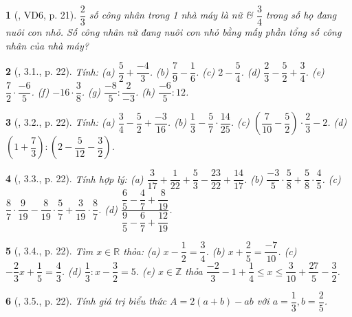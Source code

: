 \documentclass{article}
\newtheorem{baitoan}{}
\begin{document}
\begin{baitoan}[\cite{Binh_boi_duong_Toan_6_tap_2}, VD6, p. 21]
	$\dfrac{2}{3}$ số công nhân trong 1 nhà máy là nữ \& $\dfrac{3}{4}$ trong số họ đang nuôi con nhỏ. Số công nhân nữ đang nuôi con nhỏ bằng mấy phần tổng số công nhân của nhà máy?
\end{baitoan}

\begin{baitoan}[\cite{Binh_boi_duong_Toan_6_tap_2}, 3.1., p. 22]
	Tính: (a) $\dfrac{5}{2} + \dfrac{-4}{3}$. (b) $\dfrac{7}{9} - \dfrac{1}{6}$. (c) $2 - \dfrac{5}{4}$. (d) $\dfrac{2}{3} - \dfrac{5}{2} + \dfrac{3}{4}$. (e) $\dfrac{7}{2}\cdot\dfrac{-6}{5}$. (f) $-16\cdot\dfrac{3}{8}$. (g) $\dfrac{-8}{5}:\dfrac{2}{-3}$. (h) $\dfrac{-6}{5}:12$.
\end{baitoan}

\begin{baitoan}[\cite{Binh_boi_duong_Toan_6_tap_2}, 3.2., p. 22]
	Tính: (a) $\dfrac{3}{4} - \dfrac{5}{2} + \dfrac{-3}{16}$. (b) $\dfrac{1}{3} - \dfrac{5}{7}\cdot\dfrac{14}{25}$. (c) $\left(\dfrac{7}{10} - \dfrac{5}{2}\right)\cdot\dfrac{2}{3} - 2$. (d) $\left(1 + \dfrac{7}{3}\right):\left(2 - \dfrac{5}{12} - \dfrac{3}{2}\right)$.
\end{baitoan}

\begin{baitoan}[\cite{Binh_boi_duong_Toan_6_tap_2}, 3.3., p. 22]
	Tính hợp lý: (a) $\dfrac{3}{17} + \dfrac{1}{22} + \dfrac{5}{3} - \dfrac{23}{22} + \dfrac{14}{17}$. (b) $\dfrac{-3}{5}\cdot\dfrac{5}{8} + \dfrac{5}{8}\cdot\dfrac{4}{5}$. (c) $\dfrac{8}{7}\cdot\dfrac{9}{19} - \dfrac{8}{19}\cdot\dfrac{5}{7} + \dfrac{3}{19}\cdot\dfrac{8}{7}$. (d) $\dfrac{\dfrac{6}{5} - \dfrac{4}{7} + \dfrac{8}{19}}{\dfrac{9}{5} - \dfrac{6}{7} + \dfrac{12}{19}}$.
\end{baitoan}

\begin{baitoan}[\cite{Binh_boi_duong_Toan_6_tap_2}, 3.4., p. 22]
	Tìm $x\in\mathbb{R}$ thỏa: (a) $x - \dfrac{1}{2} = \dfrac{3}{4}$. (b) $x + \dfrac{2}{5} = \dfrac{-7}{10}$. (c) $-\dfrac{2}{3}x + \dfrac{1}{5} = \dfrac{4}{3}$. (d) $\dfrac{1}{3}:x - \dfrac{3}{2} = 5$. (e) $x\in\mathbb{Z}$ thỏa $\dfrac{-2}{3} - 1 + \dfrac{1}{4}\le x\le\dfrac{3}{10} + \dfrac{27}{5} - \dfrac{3}{2}$.
\end{baitoan}

\begin{baitoan}[\cite{Binh_boi_duong_Toan_6_tap_2}, 3.5., p. 22]
	Tính giá trị biểu thức $A = 2(a + b) - ab$ với $a = \dfrac{1}{3},b = \dfrac{2}{5}$.
\end{baitoan}
\end{document}
